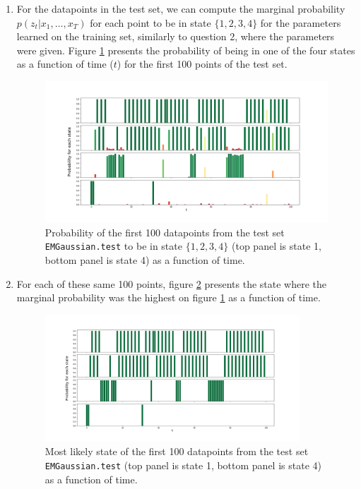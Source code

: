 \documentclass[11pt]{article}
\begin{document}
\begin{enumerate}
\item %

For the datapoints in the test set, we can compute the marginal probability $p(z_t|x_1,\dots,x_T)$ for each point to be in state $\{1,2,3,4\}$ for the parameters learned on the training set, similarly to question 2, where the parameters were given. Figure \ref{fig:real_parameters_inference} presents the probability of being in one of the four states as a function of time ($t$) for the first 100 points of the test set.

\begin{figure}[h!tbp]
\begin{center}
\includegraphics[width=\textwidth]{figures/real_param_inference.png}
\caption{Probability of the first 100 datapoints from the test set \texttt{EMGaussian.test} to be in state $\{1,2,3,4\}$ (top panel is state 1, bottom panel is state 4) as a function of time.}
\label{fig:real_parameters_inference}
\end{center}
\end{figure}

\clearpage

\item %

For each of these same 100 points, figure \ref{fig:real_parameters_choice} presents the state where the marginal probability was the highest on figure \ref{fig:real_parameters_inference} as a function of time.

\begin{figure}[h!tbp]
\begin{center}
\includegraphics[width=0.9\textwidth]{figures/real_param_choice.png}
\caption{Most likely state of the first 100 datapoints from the test set \texttt{EMGaussian.test} (top panel is state 1, bottom panel is state 4) as a function of time.}
\label{fig:real_parameters_choice}
\end{center}
\end{figure}


\end{enumerate}
\end{document}
